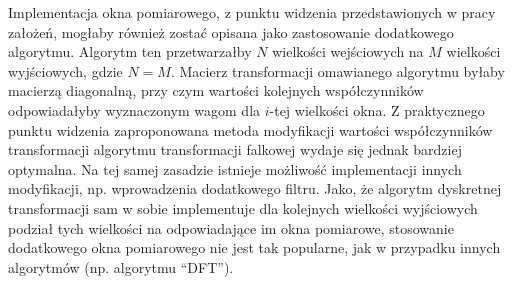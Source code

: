 Implementacja okna pomiarowego, z punktu widzenia przedstawionych w pracy założeń, mogłaby również zostać opisana jako zastosowanie dodatkowego algorytmu. Algorytm ten przetwarzałby $N$ wielkości wejściowych na $M$ wielkości wyjściowych, gdzie $N = M$. Macierz transformacji omawianego algorytmu byłaby macierzą diagonalną, przy czym wartości kolejnych współczynników odpowiadałyby wyznaczonym wagom dla $i$-tej wielkości okna. Z praktycznego punktu widzenia zaproponowana metoda modyfikacji wartości współczynników transformacji algorytmu transformacji falkowej wydaje się jednak bardziej optymalna. Na tej samej zasadzie istnieje możliwość implementacji innych modyfikacji, np. wprowadzenia dodatkowego filtru. Jako, że algorytm dyskretnej transformacji sam w sobie implementuje dla kolejnych wielkości wyjściowych podział tych wielkości na odpowiadające im okna pomiarowe, stosowanie dodatkowego okna pomiarowego nie jest tak popularne, jak w przypadku innych algorytmów (np. algorytmu \enquote{DFT}).
